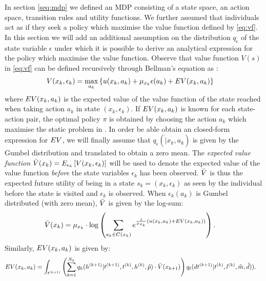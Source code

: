 In section \ref{seq:mdp} we defined an MDP consisting of a state space, an action space, transition rules and utility functions. We further assumed that individuals act as if they seek a policy which maximise the value function defined by \eqref{eq:vf}. In this section we will add an additional assumption on the distribution $q_\epsilon$ of the state variable $\epsilon$ under which it is possible to derive an analytical expression for the policy which maximise the value function. Observe that value function $V(s)$ in \eqref{eq:vf} can be defined recursively through Bellman's equation as \citep{bellman,Rust87}:
\begin{equation} \label{eq:vfbellman}
\begin{aligned}
V(x_k,\epsilon_k) &= \max_{a_k} \left\{\avgu(x_k,a_k) + \mu_{x_k}\epsilon(a_k)+ \eutil(x_k,a_k) \right\} 
\end{aligned}
\end{equation}
where $EV(x_k,a_k) $ is the expected value of the value function of the state reached when taking action $a_k$ in state $(x_k,\epsilon_k)$. If $EV(x_k,a_k)$ is known for each state-action pair, the optimal policy $\pi$ is obtained by choosing the action $a_k$ which maximise the static problem in . In order be able obtain an closed-form expression for $EV$, we will finally assume that $q_\epsilon(\dot|x_k,a_k)$ is given by the Gumbel distribution and translated to obtain a zero mean. 
The \emph{expected value function} $\bar{V}(x_k) = E_{\epsilon_k} \left[ V(x_k,\epsilon_k) \right]$ will be used to denote the expected value of the value function \emph{before} the state variables $\epsilon_k$ has been observed. $\bar{V}$ is thus the expected future utility of being in a state $s_k = (x_k,\epsilon_k)$ as seen by the individual before the state is visited and $\epsilon_k$ is observed. When $\epsilon_k(a_k)$ is Gumbel distributed (with zero mean), $\bar{V}$ is given by the log-sum:
\begin{equation} \label{eq:evfbellman}
\begin{aligned}
\ev(x_k) &= %
\mu_{x_k}\cdot\log\left(\sum_{a_k\in C(x_{k})} e^{\frac{1}{\mu_{x_k}}\left(\avgu(x_k,a_k) + \eutil(x_k,a_k)\right)}\right).
\end{aligned}
\end{equation}
Similarly, $EV(x_k,a_k)$ is given by:
\begin{equation} \label{eq:vfrust}
\begin{aligned}
    \eutil(x_k,a_k) %
    &= \int_{t\ks{k+1}} \left( \sum_{k=1}^{N_{\amem}}q_\amem(\amem\ks{k+1}|t\ks{k+1}, t\ks{k},\amem\ks{k},\act{p}) \cdot \ev(x_{k+1}) \right)q_t(dt\ks{k+1}|t\ks{k},l\ks{k},\act{m},\act{d})).
\end{aligned}
\end{equation}
